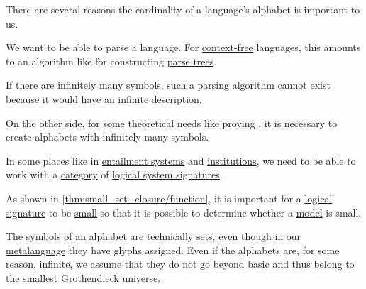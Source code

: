 \begin{remark}\label{rem:language_alphabet_cardinality}
  There are several reasons the cardinality of a language's alphabet is important to us.

  \begin{thmenum}
     We want to be able to parse a language. For \hyperref[def:chomsky_hierarchy/context_free]{context-free} languages, this amounts to an algorithm like  for constructing \hyperref[def:parse_tree]{parse trees}.

    If there are infinitely many symbols, such a parsing algorithm cannot exist because it would have an infinite description.

    On the other side, for some theoretical needs like proving , it is necessary to create alphabets with infinitely many symbols.

     In some places like in \hyperref[def:entailment_system]{entailment systems} and \hyperref[def:institution]{institutions}, we need to be able to work with a \hyperref[def:category]{category} of \hyperref[con:logical_system_signature]{logical system signatures}.

    As shown in \cref{thm:small_set_closure/function}, it is important for a \hyperref[con:logical_system_signature]{logical signature} to be \hyperref[def:small_set]{small} so that it is possible to determine whether a \hyperref[def:fol_semantics/model]{model} is small.

    The symbols of an alphabet are technically sets, even though in our \hyperref[con:metalogic]{metalanguage} they have glyphs assigned.
    Even if the alphabets are, for some reason, infinite, we assume that they do not go beyond basic \hyperref[def:zfc]{} and thus belong to the \hyperref[def:smallest_grothendieck_universe]{smallest Grothendieck universe}.
  \end{thmenum}
\end{remark}

